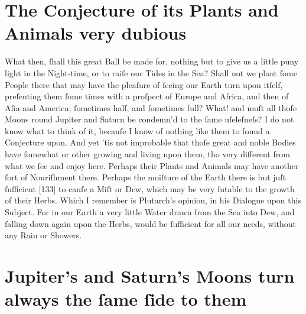 \documentclass[letterpaper]{book}
\begin{document}
\section{The Conjecture of its Plants and Animals very dubious}

What then, ſhall this great Ball be made for, nothing but to give us a little
puny light in the Night-time, or to raiſe our Tides in the Sea? Shall not
we plant ſome People there that may have the pleaſure of ſeeing our Earth
turn upon itſelf, preſenting them ſome times with a proſpect of Europe and
Africa, and then of Aſia and America; ſometimes half, and ſometimes full?
What! and muſt all thoſe Moons round Jupiter and Saturn be condemn'd
to the ſame uſeleſneſs? I do not know what to think of it, becauſe I know
of nothing like them to found a Conjecture upon. And yet 'tis not improbable that thoſe great and noble Bodies have ſomewhat or other growing
and living upon them, tho very different from what we ſee and enjoy here.
Perhaps their Plants and Animals may have another ſort of Nouriſhment
there. Perhaps the moiſture of the Earth there is but juſt ſufficient [133]
to cauſe a Miſt or Dew, which may be very ſutable to the growth of their
Herbs. Which I remember is Plutarch's opinion, in his Dialogue upon this
Subject. For in our Earth a very little Water drawn from the Sea into Dew,
and falling down again upon the Herbs, would be ſufficient for all our needs,
without any Rain or Showers.


\section{Jupiter's and Saturn's Moons turn always the ſame ſide to them}
\end{document}
